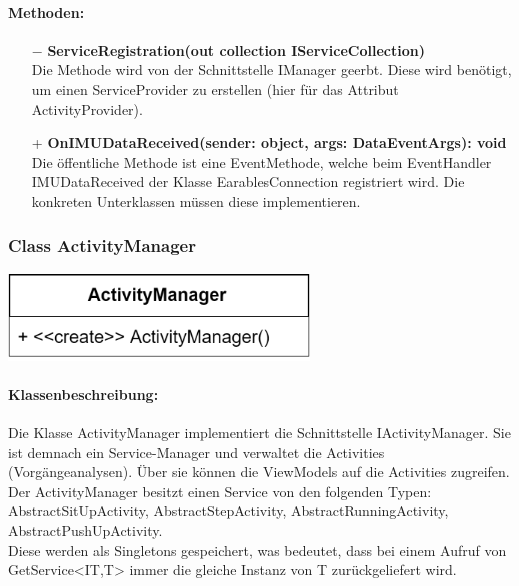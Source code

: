 \documentclass[a4paper,12pt]{article}
\begin{document}
	\paragraph{Methoden:}
	\begin{itemize}
		\item[$-$] \textbf{ServiceRegistration(out collection IServiceCollection)}\\Die Methode wird von der Schnittstelle IManager geerbt. Diese wird benötigt, um einen ServiceProvider zu erstellen (hier für das Attribut ActivityProvider).
		\item[+] \textbf{OnIMUDataReceived(sender: object, args: DataEventArgs): void}\\Die öffentliche Methode ist eine EventMethode, welche beim EventHandler IMUDataReceived der Klasse EarablesConnection registriert wird. Die konkreten Unterklassen müssen diese implementieren. 
	\end{itemize}
	
	
	
	\begin{minipage}[b]{0.5\textwidth}
		\subsubsection{Class ActivityManager}
	\end{minipage}
	\begin{minipage}[c]{0.5\textwidth}
		\includegraphics[width=0.6\textwidth]{bilder/EMKlassen/ActivityMangerClass.png}
	\end{minipage}
	\paragraph{Klassenbeschreibung:}
	Die Klasse ActivityManager implementiert die Schnittstelle IActivityManager. Sie ist demnach ein Service-Manager und verwaltet die Activities (Vorgängeanalysen). Über sie können die ViewModels auf die Activities zugreifen.\\
	Der ActivityManager besitzt einen Service von den folgenden Typen: AbstractSitUpActivity, AbstractStepActivity, AbstractRunningActivity, AbstractPushUpActivity.\\
	Diese werden als Singletons gespeichert, was bedeutet, dass bei einem Aufruf von GetService<IT,T> immer die gleiche Instanz von T zurückgeliefert wird.
	
\end{document}

